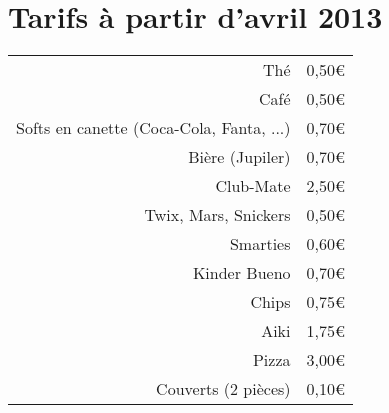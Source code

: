 \documentclass[a4paper,12pt]{article}
\begin{document}
\section*{Tarifs à partir d'avril 2013}
\LARGE
\begin{tabular}{ | r | l |}
  \hline
  Thé & 0,50\euro \\
  Café & 0,50\euro \\
  Softs en canette (Coca-Cola, Fanta, ...) & 0,70\euro \\
  Bière (Jupiler) & 0,70\euro \\
  Club-Mate & 2,50\euro \\
  \hline
  Twix, Mars, Snickers & 0,50\euro \\
  Smarties & 0,60\euro \\
  Kinder Bueno & 0,70\euro \\
  Chips & 0,75\euro \\
  \hline
  Aiki & 1,75\euro \\
  Pizza & 3,00\euro \\
  \hline
  Couverts (2 pièces) & 0,10\euro \\
  \hline
  
  \hline
\end{tabular}
\end{document}
